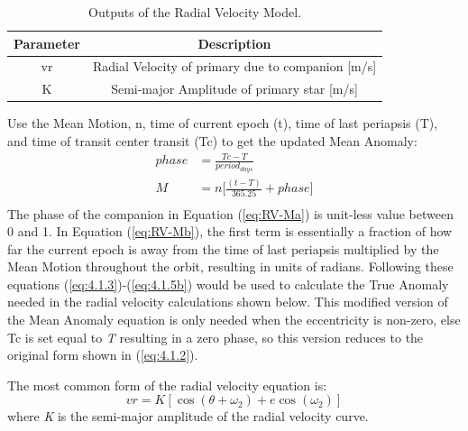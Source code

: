 \documentclass[12pt,preprint]{aastex}
\begin{document}

\begin{table}[h]
\centering
\caption{ Outputs of the Radial Velocity Model.}
\begin{tabular}{c c}
\hline\hline
Parameter & Description \\
\hline
vr & Radial Velocity of primary due to companion [m/s] \\
K & Semi-major Amplitude of primary star [m/s]\\
\hline
\end{tabular}
\end{table}

\pagebreak

Use the Mean Motion, n, time of current epoch (t), time of last periapsis (T), and time of transit center transit (Tc) to get the updated Mean Anomaly:
\begin{subequations}\label{eq:RV-Ma}
\begin{align}
phase& = \frac{Tc-T}{period_{days}} \\
\label{eq:RV-Mb}
M& = n \bigg[ \frac{(t-T)}{365.25} +phase \bigg]\\
\end{align}
\end{subequations}
The phase of the companion in Equation (\ref{eq:RV-Ma}) is unit-less value between 0 and 1.  In Equation (\ref{eq:RV-Mb}), the first term is essentially a fraction of how far the current epoch is away from the time of last periapsis multiplied by the Mean Motion throughout the orbit, resulting in units of radians.  Following these equations (\ref{eq:4.1.3})-(\ref{eq:4.1.5b}) would be used to calculate the True Anomaly needed in the radial velocity calculations shown below.  This modified version of the Mean Anomaly equation is only needed when the eccentricity is non-zero, else Tc is set equal to {\it T} resulting in a zero phase, so this version reduces to the original form shown in (\ref{eq:4.1.2}).

The most common form of the radial velocity equation is:
\begin{equation}\label{eq:rvStandard}
vr =  K[\cos(\theta+\omega_2)+e \cos(\omega_2)]
\end{equation}
where {\it K} is the semi-major amplitude of the radial velocity curve.
\end{document}
